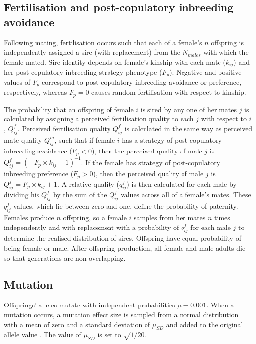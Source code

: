 \documentclass[10pt,letterpaper]{article}
\begin{document}
\subsection*{Fertilisation and post-copulatory inbreeding avoidance}

Following mating, fertilisation occurs such that each of a female's $n$ offspring is independently assigned a sire (with replacement) from the $N_{males}$ with which the female mated. Sire identity depends on female's kinship with each mate ($k_{ij}$) and her post-copulatory inbreeding strategy phenotype ($F_{p}$). Negative and positive values of $F_{p}$ correspond to post-copulatory inbreeding avoidance or preference, respectively, whereas $F_{p}=0$ causes random fertilisation with respect to kinship.

The probability that an offspring of female $i$ is sired by any one of her mates $j$ is calculated by assigning a perceived fertilisation quality to each $j$ with respect to $i$, $Q^{f}_{ij}$. Perceived fertilisation quality $Q^{f}_{ij}$ is calculated in the same way as perceived mate quality $Q^{m}_{ij}$, such that if female $i$ has a strategy of post-copulatory inbreeding avoidance ($F_{p}<0$), then the perceived quality of male $j$ is $Q^{f}_{ij} = (-F_{p} \times k_{ij} + 1)^{-1}$. If the female has strategy of post-copulatory inbreeding preference ($F_{p}>0$), then the perceived quality of male $j$ is $Q^{f}_{ij} = F_{p} \times k_{ij} + 1$. A relative quality ($q^{f}_{ij}$) is then calculated for each male by dividing his $Q^{f}_{ij}$ by the sum of the $Q^{f}_{ij}$ values across all of a female's mates. These $q^{f}_{ij}$ values, which lie between zero and one, define the probability of paternity. Females produce $n$ offspring, so a female $i$ samples from her mates $n$ times independently and with replacement with a probability of $q^{f}_{ij}$ for each male $j$ to determine the realised distribution of sires. Offspring have equal probability of being female or male. After offspring production, all female and male adults die so that generations are non-overlapping.

\subsection*{Mutation}

Offsprings' alleles mutate with independent probabilities $\mu=0.001$. When a mutation occurs, a mutation effect size is sampled from a normal distribution with a mean of zero and a standard deviation of $\mu_{SD}$ and added to the original allele value \cite[][]{Kimura1965, Lande1976, Bocedi2014, Duthie}. The value of $\mu_{SD}$ is set to $\sqrt{1/20}$.
\end{document}
